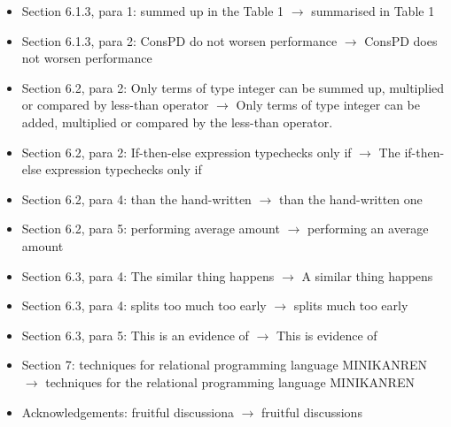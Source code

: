 \begin{itemize}
  \item{Section 6.1.3, para 1: summed up in the Table 1 $\rightarrow$ summarised in Table 1}
  \item{Section 6.1.3, para 2: ConsPD do not worsen performance $\rightarrow$ ConsPD does not worsen performance}
  \item{Section 6.2, para 2: Only terms of type integer can be summed up, multiplied or compared by less-than operator $\rightarrow$ Only terms of type integer can be added, multiplied or compared by the less-than operator.}
  \item{Section 6.2, para 2: If-then-else expression typechecks only if $\rightarrow$ The if-then-else expression typechecks only if}
  \item{Section 6.2, para 4: than the hand-written $\rightarrow$ than the hand-written one}
  \item{Section 6.2, para 5: performing average amount $\rightarrow$ performing an average amount}
  \item{Section 6.3, para 4: The similar thing happens $\rightarrow$ A similar thing happens}
  \item{Section 6.3, para 4: splits too much too early $\rightarrow$ splits much too early}
  \item{Section 6.3, para 5: This is an evidence of $\rightarrow$ This is evidence of}
  \item{Section 7: techniques for relational programming language MINIKANREN $\rightarrow$ techniques for the relational programming language MINIKANREN}
  \item{Acknowledgements: fruitful discussiona $\rightarrow$ fruitful discussions}
\end{itemize}